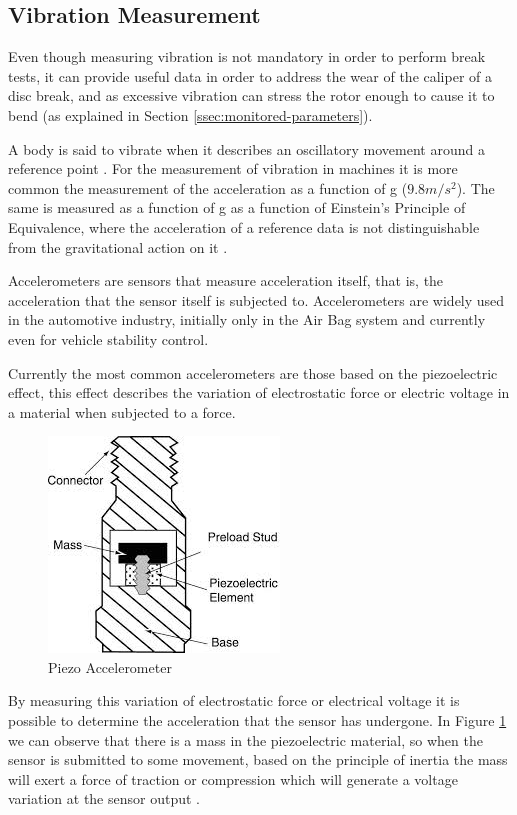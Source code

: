 \subsection{Vibration Measurement}\label{ssec:vibrationMeasurement}
		
		Even though measuring vibration is not mandatory in order to perform break tests, it can provide useful data in order to address the wear of the caliper of a disc break, and as excessive vibration can stress the rotor enough to cause it to bend (as explained in Section \ref{ssec:monitored-parameters}).
		\par
		A body is said to vibrate when it describes an oscillatory movement around a reference point \cite{joaocan2000}. For the measurement of vibration in machines it is more common the measurement of the acceleration as a function of g ($9.8m/s^2$). The same is measured as a function of g as a function of Einstein's Principle of Equivalence, where the acceleration of a reference data is not distinguishable from the gravitational action on it \cite{nordtvedt1968equivalence}.
		\par
		Accelerometers are sensors that measure acceleration itself, that is, the acceleration that the sensor itself is subjected to. Accelerometers are widely used in the automotive industry, initially only in the Air Bag system and currently even for vehicle stability control.
		\par
		Currently the most common accelerometers are those based on the piezoelectric effect, this effect describes the variation of electrostatic force or electric voltage in a material when subjected to a force.

		\begin{figure}[htbp]
			\centering
				\includegraphics[width=.5\textwidth]{figuras/fig-piezo-acel.jpg}
			\caption{Piezo Accelerometer \cite{piezo-accel}}
			\label{fig:piezoAccelerometer}
		\end{figure}

		By measuring this variation of electrostatic force or electrical voltage it is possible to determine the acceleration that the sensor has undergone. In Figure \ref{fig:piezoAccelerometer} we can observe that there is a mass in the piezoelectric material, so when the sensor is submitted to some movement, based on the principle of inertia the mass will exert a force of traction or compression which will generate a voltage variation at the sensor output \cite{patrick2006}.
